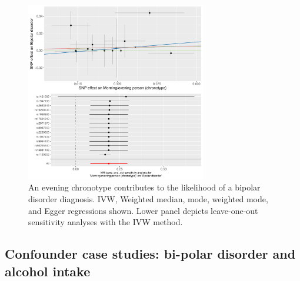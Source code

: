 \documentclass[journal,article,submit,moreauthors,pdftex]{Definitions/mdpi}
\begin{document}
\begin{figure}[htbp]
	\centering
    \includegraphics[width=0.7\textwidth]{Figs/Analysis2/Morning_evening_person_(chronotype)_vs_Bipolar_disorder.Plots.pdf}
    \caption{An evening chronotype contributes to the likelihood of a bipolar disorder diagnosis. IVW, Weighted median, mode, weighted mode, and Egger regressions shown. Lower panel depicts leave-one-out sensitivity analyses with the IVW method.}
	\label{bipolar}
\end{figure}















\subsection{Confounder case studies: bi-polar disorder and alcohol intake}
\end{document}
